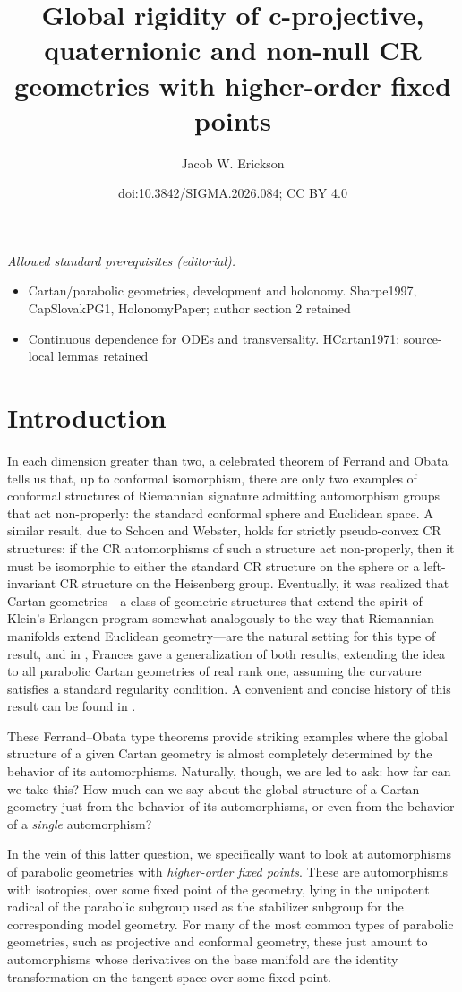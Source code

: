 \documentclass[10pt,a4paper]{amsart}
\title{Global rigidity of c-projective, quaternionic and non-null CR geometries with higher-order fixed points}
\author{Jacob W. Erickson}
\date{doi:10.3842/SIGMA.2026.084; CC BY 4.0}
\numberwithin{equation}{section}
\theoremstyle{definition}
\begin{document}
\maketitle
\noindent\textit{Allowed standard prerequisites (editorial).}\begin{itemize}
\item Cartan/parabolic geometries, development and holonomy. Sharpe1997, CapSlovakPG1, HolonomyPaper; author section 2 retained
\item Continuous dependence for ODEs and transversality. HCartan1971; source-local lemmas retained
\end{itemize}\medskip
\section{Introduction}
In each dimension greater than two, a celebrated theorem of Ferrand and Obata tells us that, up to conformal isomorphism, there are only two examples of conformal structures of Riemannian signature admitting automorphism groups that act non-properly: the standard conformal sphere and Euclidean space. A similar result, due to Schoen and Webster, holds for strictly pseudo-convex CR structures: if the CR automorphisms of such a structure act non-properly, then it must be isomorphic to either the standard CR structure on the sphere or a left-invariant CR structure on the Heisenberg group. Eventually, it was realized that Cartan geometries---a class of geometric structures that extend the spirit of Klein's Erlangen program somewhat analogously to the way that Riemannian manifolds extend Euclidean geometry---are the natural setting for this type of result, and in \cite{Frances2007}, Frances gave a generalization of both results, extending the idea to all parabolic Cartan geometries of real rank one, assuming the curvature satisfies a standard regularity condition. A convenient and concise history of this result can be found in \cite{MelnickFO}.

\!These Ferrand--Obata type theorems provide striking examples where the global structure of a given Cartan geometry is almost completely determined by the behavior of its automorphisms. Naturally, though, we are led to ask: how far can we take this? How much can we say about the global structure of a Cartan geometry just from the behavior of its automorphisms, or even from the behavior of a \textit{single} automorphism?

In the vein of this latter question, we specifically want to look at automorphisms of parabolic geometries with \textit{higher-order fixed points}. These are automorphisms with isotropies, over some fixed point of the geometry, lying in the unipotent radical of the parabolic subgroup used as the stabilizer subgroup for the corresponding model geometry. For many of the most common types of parabolic geometries, such as projective and conformal geometry, these just amount to automorphisms whose derivatives on the base manifold are the identity transformation on the tangent space over some fixed point.
\end{document}
